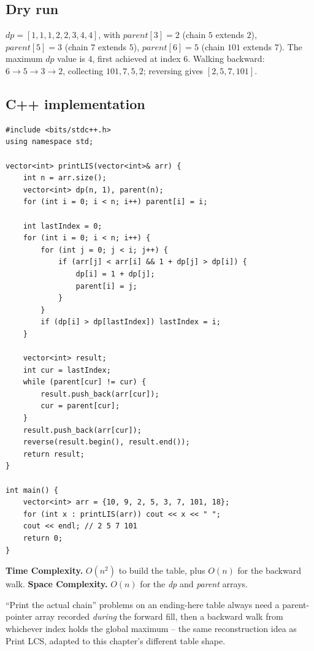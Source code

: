 \subsection*{Dry run}


$\textit{dp}=[1,1,1,2,2,3,4,4]$, with $\textit{parent}[3]=2$ (chain
$5$ extends $2$), $\textit{parent}[5]=3$ (chain $7$ extends $5$),
$\textit{parent}[6]=5$ (chain $101$ extends $7$). The maximum
$\textit{dp}$ value is $4$, first achieved at index $6$. Walking
backward: $6 \to 5 \to 3 \to 2$, collecting $101, 7, 5, 2$; reversing
gives $[2,5,7,101]$.

\subsection*{C++ implementation}

\begin{lstlisting}
#include <bits/stdc++.h>
using namespace std;

vector<int> printLIS(vector<int>& arr) {
    int n = arr.size();
    vector<int> dp(n, 1), parent(n);
    for (int i = 0; i < n; i++) parent[i] = i;

    int lastIndex = 0;
    for (int i = 0; i < n; i++) {
        for (int j = 0; j < i; j++) {
            if (arr[j] < arr[i] && 1 + dp[j] > dp[i]) {
                dp[i] = 1 + dp[j];
                parent[i] = j;
            }
        }
        if (dp[i] > dp[lastIndex]) lastIndex = i;
    }

    vector<int> result;
    int cur = lastIndex;
    while (parent[cur] != cur) {
        result.push_back(arr[cur]);
        cur = parent[cur];
    }
    result.push_back(arr[cur]);
    reverse(result.begin(), result.end());
    return result;
}

int main() {
    vector<int> arr = {10, 9, 2, 5, 3, 7, 101, 18};
    for (int x : printLIS(arr)) cout << x << " ";
    cout << endl; // 2 5 7 101
    return 0;
}
\end{lstlisting}

\begin{complexitybox}
\textbf{Time Complexity.} $O(n^2)$ to build the table, plus $O(n)$ for
the backward walk.
\textbf{Space Complexity.} $O(n)$ for the \textit{dp} and
\textit{parent} arrays.
\end{complexitybox}

\begin{takeawaybox}
``Print the actual chain'' problems on an ending-here table always need
a parent-pointer array recorded \emph{during} the forward fill, then a
backward walk from whichever index holds the global maximum -- the same
reconstruction idea as Print LCS, adapted to this chapter's different
table shape.
\end{takeawaybox}
